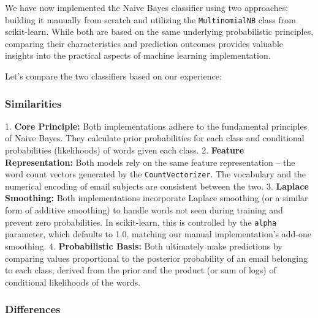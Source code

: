 \documentclass[12pt,a4paper]{article}
\begin{document}
We have now implemented the Naive Bayes classifier using two approaches: building it manually from scratch and utilizing the \texttt{MultinomialNB} class from scikit-learn. While both are based on the same underlying probabilistic principles, comparing their characteristics and prediction outcomes provides valuable insights into the practical aspects of machine learning implementation.

Let's compare the two classifiers based on our experience:

\subsubsection{Similarities}

1.  \textbf{Core Principle:} Both implementations adhere to the fundamental principles of Naive Bayes. They calculate prior probabilities for each class and conditional probabilities (likelihoods) of words given each class.
2.  \textbf{Feature Representation:} Both models rely on the same feature representation – the word count vectors generated by the \texttt{CountVectorizer}. The vocabulary and the numerical encoding of email subjects are consistent between the two.
3.  \textbf{Laplace Smoothing:} Both implementations incorporate Laplace smoothing (or a similar form of additive smoothing) to handle words not seen during training and prevent zero probabilities. In scikit-learn, this is controlled by the \texttt{alpha} parameter, which defaults to 1.0, matching our manual implementation's add-one smoothing.
4.  \textbf{Probabilistic Basis:} Both ultimately make predictions by comparing values proportional to the posterior probability of an email belonging to each class, derived from the prior and the product (or sum of logs) of conditional likelihoods of the words.

\subsubsection{Differences}
\end{document}

